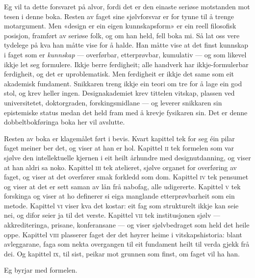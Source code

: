 Eg vil ta dette forsvaret på alvor, fordi det er den einaste seriøse motstanden mot tesen i denne boka. Resten av faget sine sjølvforsvar er for tynne til å trenge motargument. Men «design er ein eigen kunnskapsform» er ein reell filosofisk posisjon, framført av seriøse folk, og om han held, fell boka mi. Så lat oss vere tydelege på kva han måtte vise for å halde. Han måtte vise at det finst kunnskap i faget som er \emph{kunnskap} — overførbar, etterprøvbar, kumulativ — og som likevel ikkje let seg formulere. Ikkje berre ferdigheit; alle handverk har ikkje-formulerbar ferdigheit, og det er uproblematisk. Men ferdigheit er ikkje det same som eit akademisk fundament. Snikkaren treng ikkje ein teori om tre for å lage ein god stol, og krev heller ingen. Designakademiet krev tittelen vitskap, plassen ved universitetet, doktorgraden, forskingsmidlane — og leverer snikkaren sin epistemiske status medan det held fram med å krevje fysikaren sin. Det er denne dobbeltbokføringa boka her vil avslutte.

\vignett

Resten av boka er klagemålet ført i bevis. Kvart kapittel tek for seg éin pilar faget meiner ber det, og viser at han er hol. Kapittel \textsc{ii} tek formelen som var sjølve den intellektuelle kjernen i eit heilt århundre med designutdanning, og viser at han aldri sa noko. Kapittel \textsc{iii} tek atelieret, sjølve organet for overføring av faget, og viser at det overfører smak forkledd som dom. Kapittel \textsc{iv} tek pensumet og viser at det er sett saman av lån frå nabofag, alle udigererte. Kapittel \textsc{v} tek forskinga og viser at ho definerer si eiga manglande etterprøvbarheit som ein metode. Kapittel \textsc{vi} viser kva det kostar: eit fag som strukturelt ikkje kan seie nei, og difor seier ja til det verste. Kapittel \textsc{vii} tek institusjonen sjølv — akkrediteringa, prisane, konferansane — og viser sjølvbedraget som held det heile oppe. Kapittel \textsc{viii} plasserer faget der det høyrer heime i vitskapshistoria: blant avleggarane, faga som nekta overgangen til eit fundament heilt til verda gjekk frå dei. Og kapittel \textsc{ix}, til sist, peikar mot grunnen som finst, om faget vil ha han.

Eg byrjar med formelen.
